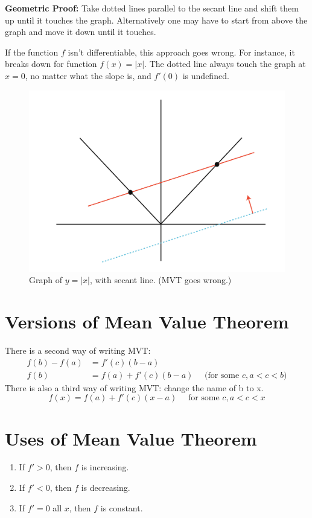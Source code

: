 \textbf{Geometric Proof: } Take dotted lines parallel to the secant line and shift them up until it touches the graph.
Alternatively one may have to start from above the graph and move it down until it touches.

If the function $f$ isn't differentiable, this approach goes wrong.
For instance, it breaks down for function $f(x) = |x|$. 
The dotted line always touch the graph at $x=0$, no matter what the slope is, and $f'(0)$ is undefined.

\begin{figure}[ht!]
	\centering
	\includegraphics[scale=0.7]{./images/lecture_9_figure_2.png}
	\caption{Graph of $y = |x|$, with secant line. (MVT goes wrong.)}
\end{figure}

\section{Versions of Mean Value Theorem}

There is a second way of writing MVT:
\begin{align*}
    f(b) - f(a) & = f'(c)(b-a) \\ 
    f(b) & = f(a) + f'(c)(b-a) \quad \text{ (for some $c, a < c < b$)}
\end{align*}
There is also a third way of writing MVT: change the name of b to x.
$$ \boxed{ f(x) = f(a) + f'(c)(x-a) \quad \text{ for some } c, a < c < x } $$


\section{Uses of Mean Value Theorem}

\begin{enumerate}
    \item If $f' > 0$, then $f$ is increasing.
    \item If $f' < 0$, then $f$ is decreasing.
    \item If $f' = 0$ all $x$, then $f$ is constant.
\end{enumerate}